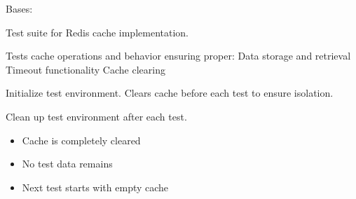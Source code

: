 \documentclass[letterpaper,10pt,english]{sphinxmanual}
\begin{document}
\begin{fulllineitems}
\label{\detokenize{pages_app.tests:pages_app.tests.test_cache.CacheTests}}
\pysigstartsignatures
\pysiglinewithargsret
{}
{}
{}
\pysigstopsignatures
\sphinxAtStartPar
Bases: 

\sphinxAtStartPar
Test suite for Redis cache implementation.

\sphinxAtStartPar
Tests cache operations and behavior ensuring proper:
\sphinxhyphen{} Data storage and retrieval
\sphinxhyphen{} Timeout functionality
\sphinxhyphen{} Cache clearing

\begin{fulllineitems}
\label{\detokenize{pages_app.tests:pages_app.tests.test_cache.CacheTests.setUp}}
\pysigstartsignatures
\pysiglinewithargsret
{}
{}
{}
\pysigstopsignatures
\sphinxAtStartPar
Initialize test environment.
Clears cache before each test to ensure isolation.

\end{fulllineitems}


\begin{fulllineitems}
\label{\detokenize{pages_app.tests:pages_app.tests.test_cache.CacheTests.tearDown}}
\pysigstartsignatures
\pysiglinewithargsret
{}
{}
{}
\pysigstopsignatures
\sphinxAtStartPar
Clean up test environment after each test.
\begin{description}
\begin{itemize}
\item {} 
\sphinxAtStartPar
Cache is completely cleared

\item {} 
\sphinxAtStartPar
No test data remains

\item {} 
\sphinxAtStartPar
Next test starts with empty cache


\end{itemize}
\end{description}
\end{fulllineitems}
\end{fulllineitems}
\end{document}
